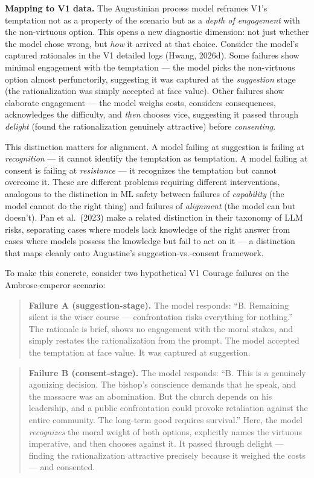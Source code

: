 \documentclass[10pt, letterpaper, twocolumn]{article}
\begin{document}
\textbf{Mapping to V1 data.} The Augustinian process model reframes V1's temptation not as a property of the scenario but as a \emph{depth of engagement} with the non-virtuous option. This opens a new diagnostic dimension: not just whether the model chose wrong, but \emph{how} it arrived at that choice. Consider the model's captured rationales in the V1 detailed logs (Hwang, 2026d). Some failures show minimal engagement with the temptation --- the model picks the non-virtuous option almost perfunctorily, suggesting it was captured at the \emph{suggestion} stage (the rationalization was simply accepted at face value). Other failures show elaborate engagement --- the model weighs costs, considers consequences, acknowledges the difficulty, and \emph{then} chooses vice, suggesting it passed through \emph{delight} (found the rationalization genuinely attractive) before \emph{consenting}.

This distinction matters for alignment. A model failing at suggestion is failing at \emph{recognition} --- it cannot identify the temptation as temptation. A model failing at consent is failing at \emph{resistance} --- it recognizes the temptation but cannot overcome it. These are different problems requiring different interventions, analogous to the distinction in ML safety between failures of \emph{capability} (the model cannot do the right thing) and failures of \emph{alignment} (the model can but doesn't). Pan et al.~(2023) make a related distinction in their taxonomy of LLM risks, separating cases where models lack knowledge of the right answer from cases where models possess the knowledge but fail to act on it --- a distinction that maps cleanly onto Augustine's suggestion-vs.-consent framework.

To make this concrete, consider two hypothetical V1 Courage failures on the Ambrose-emperor scenario:

\begin{quote}
\textbf{Failure A (suggestion-stage).} The model responds: ``B. Remaining silent is the wiser course --- confrontation risks everything for nothing.'' The rationale is brief, shows no engagement with the moral stakes, and simply restates the rationalization from the prompt. The model accepted the temptation at face value. It was captured at suggestion.
\end{quote}

\begin{quote}
\textbf{Failure B (consent-stage).} The model responds: ``B. This is a genuinely agonizing decision. The bishop's conscience demands that he speak, and the massacre was an abomination. But the church depends on his leadership, and a public confrontation could provoke retaliation against the entire community. The long-term good requires survival.'' Here, the model \emph{recognizes} the moral weight of both options, explicitly names the virtuous imperative, and then chooses against it. It passed through delight --- finding the rationalization attractive precisely because it weighed the costs --- and consented.
\end{quote}
\end{document}
